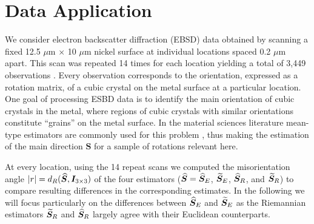 \section{Data Application}\label{sec:data}

We consider electron backscatter diffraction (EBSD) data obtained by scanning a fixed  12.5 $\mu$m $\times$ 10 $\mu$m nickel surface at individual locations spaced 0.2 $\mu$m apart. This scan was repeated 14 times for each location yielding a total of 3,449 observations \citep{bingham09, bingham10b}. Every observation corresponds to the orientation, expressed as a rotation matrix, of a cubic crystal on the metal surface at a particular location. One goal of processing ESBD data is to identify the main orientation of cubic crystals in the metal, where regions of cubic crystals with similar orientations constitute ``grains'' on the metal surface.  In the material sciences literature mean-type estimators are commonly used for this problem \citep{humbert1996,cho2005,bachmann2010}, thus making the estimation of the main direction $\bm S$ for a sample of rotations relevant here.

At every location, using the 14 repeat scans  we computed the misorientation angle $|r|={d_R}(\widehat{\bm{S}}, \bm I_{3\times 3})$ of the four estimators ($\widehat{\bm{S}}= {\widehat{\bm S}_E}$, ${\widetilde{\bm S}_E}$, ${\widehat{\bm S}_R}$, and ${\widetilde{\bm S}_R}$) to compare resulting differences in the corresponding estimates.  In the following we will focus particularly on the differences between ${\widehat{\bm S}_E}$ and ${\widetilde{\bm S}_E}$ as the Riemannian estimators  ${\widetilde{\bm S}_R}$ and ${\widehat{\bm S}_R}$ largely agree with their Euclidean counterparts. 

